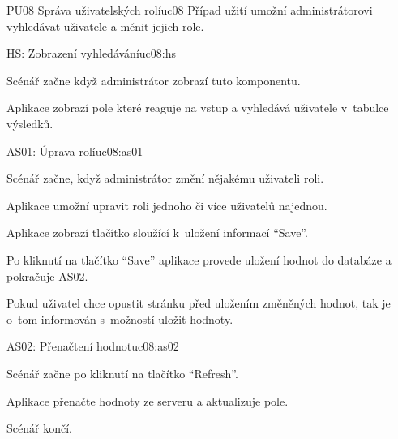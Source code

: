 \begin{usecase}{PU08 Správa uživatelských rolí}{uc08}
    Případ užití umožní administrátorovi vyhledávat uživatele a měnit jejich role.

    \begin{scenario}{HS: Zobrazení vyhledávání}{uc08:hs}
        \item Scénář začne když administrátor zobrazí tuto komponentu.
        \item Aplikace zobrazí pole které reaguje na vstup a vyhledává uživatele v~tabulce výsledků.
    \end{scenario}

    \begin{scenario}{AS01: Úprava rolí}{uc08:as01}
        \item Scénář začne, když administrátor změní nějakému uživateli roli.
        \item Aplikace umožní upravit roli jednoho či více uživatelů najednou.
        \item Aplikace zobrazí tlačítko sloužící k~uložení informací \enquote{Save}.
        \item Po kliknutí na tlačítko \enquote{Save} aplikace provede uložení hodnot do databáze a pokračuje \hyperref[uc02:as02]{AS02}.
        \item Pokud uživatel chce opustit stránku před uložením změněných hodnot, tak je o~tom informován s~možností uložit hodnoty.
    \end{scenario}

    \begin{scenario}{AS02: Přenačtení hodnot}{uc08:as02}
        \item Scénář začne po kliknutí na tlačítko \enquote{Refresh}.
        \item Aplikace přenačte hodnoty ze serveru a aktualizuje pole.
        \item Scénář končí.
    \end{scenario}
\end{usecase}